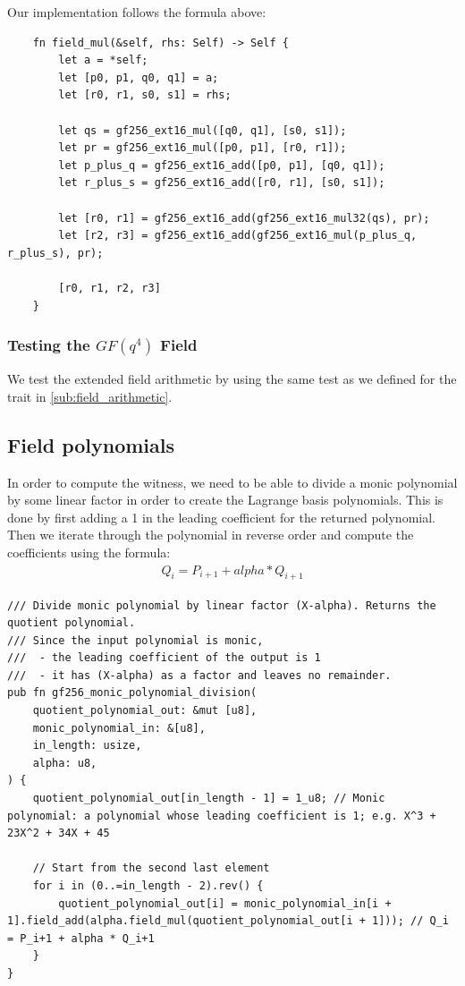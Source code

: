 \documentclass[11pt]{report}
\theoremstyle{definition}
\theoremstyle{plain}
\begin{document}
Our implementation follows the formula above:
\begin{verbatim}
    fn field_mul(&self, rhs: Self) -> Self {
        let a = *self;
        let [p0, p1, q0, q1] = a;
        let [r0, r1, s0, s1] = rhs;

        let qs = gf256_ext16_mul([q0, q1], [s0, s1]);
        let pr = gf256_ext16_mul([p0, p1], [r0, r1]);
        let p_plus_q = gf256_ext16_add([p0, p1], [q0, q1]);
        let r_plus_s = gf256_ext16_add([r0, r1], [s0, s1]);

        let [r0, r1] = gf256_ext16_add(gf256_ext16_mul32(qs), pr);
        let [r2, r3] = gf256_ext16_add(gf256_ext16_mul(p_plus_q, r_plus_s), pr);

        [r0, r1, r2, r3]
    }
\end{verbatim}

\subsubsection{Testing the $GF(q^4)$ Field}
We test the extended field arithmetic by using the same test as we defined for the trait in \autoref{sub:field_arithmetic}.


\subsection{Field polynomials}\label{sub:field_polynomials} %
In order to compute the witness, we need to be able to divide a monic polynomial by some linear factor in order to create the Lagrange basis polynomials.
This is done by first adding a 1 in the leading coefficient for the returned polynomial. Then we iterate through the polynomial in reverse order and compute the coefficients using the formula:
\begin{align}
  Q_i = P_{i+1} + alpha * Q_{i+1}
\end{align}
\begin{verbatim}
/// Divide monic polynomial by linear factor (X-alpha). Returns the quotient polynomial. 
/// Since the input polynomial is monic, 
///  - the leading coefficient of the output is 1 
///  - it has (X-alpha) as a factor and leaves no remainder.
pub fn gf256_monic_polynomial_division(
    quotient_polynomial_out: &mut [u8],
    monic_polynomial_in: &[u8],
    in_length: usize,
    alpha: u8,
) {
    quotient_polynomial_out[in_length - 1] = 1_u8; // Monic polynomial: a polynomial whose leading coefficient is 1; e.g. X^3 + 23X^2 + 34X + 45

    // Start from the second last element
    for i in (0..=in_length - 2).rev() {
        quotient_polynomial_out[i] = monic_polynomial_in[i + 1].field_add(alpha.field_mul(quotient_polynomial_out[i + 1])); // Q_i = P_i+1 + alpha * Q_i+1
    }
}
\end{verbatim}
\end{document}
